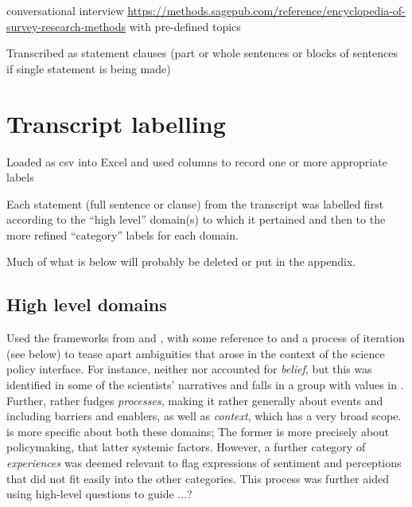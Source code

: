 conversational interview \url{https://methods.sagepub.com/reference/encyclopedia-of-survey-research-methods} with pre-defined topics

Transcribed as statement clauses (part or whole sentences or blocks of sentences if single statement is being made)

\section{Transcript labelling}\label{sec:metlabelling}

Loaded as csv into Excel and used columns to record one or more appropriate labels

Each statement (full sentence or clause) from the transcript was labelled first according to the ``high level'' domain(s) to which it pertained and then to the more refined ``category'' labels for each domain.

 Much of what is below will probably be deleted or put in the appendix.



\subsection{High level domains}
Used the frameworks from \textcite{BuseMW2012} and \textcite{HaynesDCRHGS2011}, with some reference to \textcite{DarntonH2013} and a process of iteration (see below) to tease apart ambiguities that arose in the context of the science policy interface. For instance, neither \textcite{BuseMW2012} nor \textcite{HaynesDCRHGS2011} accounted for \emph{belief}, but this was identified in some of the scientists' narratives and falls in a group with values in \textcite{DarntonH2013}. Further, \textcite{HaynesDCRHGS2011} rather fudges \emph{processes}, making it rather generally about events and including barriers and enablers, as well as \emph{context}, which has a very broad scope. \textcite{BuseMW2012} is more specific about both these domains; The former is more precisely about policymaking, that latter systemic factors. However, a further category of \emph{experiences} was deemed relevant to flag expressions of sentiment and perceptions that did not fit easily into the other categories. This process was further aided using high-level questions to guide ...?

